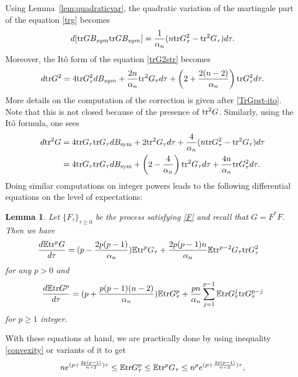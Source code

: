 \documentclass[english, letterpaper,12pt,reqno]{amsart}
\newtheorem{lemma}[theorem]{Lemma}
\theoremstyle{remark}
\theoremstyle{plain}
\newcommand{\1}{\mathbf{1}}
\def\bbE{\mathbb E}
\def\tr{{\rm tr}}
\begin{document}
%
\noindent
Using Lemma~\ref{lem:quadraticvar}, the quadratic variation of the martingale part of the equation \eqref{trg} becomes
%
\begin{align}\label{qv}
    d[\tr  G B_{ sym} \tr  G B_{ sym}]=\frac{1}{\alpha_n} (n \tr  G_\tau^2-\tr^2 G_\tau )d\tau.
\end{align} 
Moreover, the Itô form of the equation \eqref{trG2str} becomes
%
\begin{align}\label{trg2}
d\tr G^2=4\tr G_\tau^2dB_{sym}+\frac{2n}{\alpha_n} \tr^2 G_\tau d\tau +\left(2+\frac{2(n-2)}{\alpha_n}\right)\tr  G_\tau^2d\tau. 
\end{align}
%
More details on the computation of the correction is given after \eqref{TrGpst-ito}. 
Note that this is not closed because of the presence of $\tr^2 G$. Similarly, using the Itô formula, one sees \begin{align}
\begin{aligned}    d\tr^2 G &=4 \tr G_\tau \tr G_\tau dB_{\text{sym}} +2 \tr^2 G_\tau d\tau+ \frac{4}{\alpha_n} (n \tr  G_\tau^2-\tr^2 G_\tau )d\tau\\&=4 \tr G_\tau \tr G_\tau dB_{\text{sym}} +\left(2-\frac{4}{\alpha_n}\right) \tr^2 G_\tau d\tau+ \frac{4n}{\alpha_n} \tr  G_\tau^2 d\tau. \end{aligned}\label{tr2g}
\end{align}
%
Doing similar computations on integer powers leads to the following differential equations on the level of expectations:
%
\begin{lemma}\label{lem:odes}
   Let $\{F_\tau\}_{\tau\geq 0}$ be the process satisfying \eqref{F} and recall that $G=F^*F$. Then we have
   \begin{align}\label{trpg}
 \frac{ d\bbE\tr^p G}{d\tau}& =(p-\frac{2p(p-1)}{\alpha_n}) \bbE\tr^p G_\tau +\frac{2p(p-1)n}{\alpha_n}  \bbE\tr^{p-2} G_\tau\tr  G_\tau^2  
\end{align}
%
for any $p>0$ and 
%
\begin{align}\label{trgp}
   \frac{ d \bbE\tr G^p}{d\tau}=(p+\frac{p(p-1)(n-2)}{\alpha_n}) \bbE\tr G_\tau^p  +\frac{pn}{\alpha_n}\sum_{j=1}^{p-1}\bbE\tr G_\tau^j \tr G_\tau^{p-j}  
\end{align}
%
for $p\geq 1$ integer. 
\end{lemma}
\noindent
With these equations at hand, we are practically done by using inequality \eqref{convexity} or variants of it to get 
%
\begin{align}\label{lpestimates}
n   e^{(p+\frac{2p(p-1)}{n+2})\tau} \leq  \bbE\tr  G_\tau^p \leq   \bbE\tr^p  G_\tau \leq  n^pe^{(p+\frac{2p(p-1)}{n+2})\tau},
\end{align}
\end{document}
